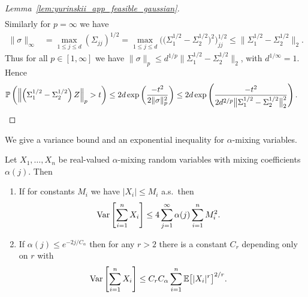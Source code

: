 \begin{proof}[Lemma~\ref{lem:yurinskii_app_feasible_gaussian}]
\begin{align*}
  \end{align*}
  Similarly for $p = \infty$ we have
  \begin{align*}
    \|\sigma\|_\infty
    &=
    \max_{1 \leq j \leq d}
    (\Sigma_{j j})^{1/2}
    =
    \max_{1 \leq j \leq d}
    \Big(\big(\Sigma_1^{1/2} - \Sigma_2^{1/2}\big)^2\Big)_{j j}^{1/2}
    \leq
    \big\|\Sigma_1^{1/2} - \Sigma_2^{1/2}\big\|_2.
  \end{align*}
  Thus for all $p \in [1, \infty]$ we have
  $\|\sigma\|_p \leq
  d^{1/p} \big\|\Sigma_1^{1/2} - \Sigma_2^{1/2}\big\|_2$,
  with $d^{1/\infty} = 1$. Hence
  \begin{align*}
    \P\left(
      \left\|
      \left(\Sigma_1^{1/2} - \Sigma_2^{1/2}\right) Z
      \right\|_p
      > t
    \right)
    &\leq
    2 d \exp \left( \frac{-t^2}{2 \|\sigma\|_p^2} \right)
    \leq
    2 d \exp \left(
      \frac{-t^2}
      {2 d^{2/p} \big\|\Sigma_1^{1/2} - \Sigma_2^{1/2}\big\|_2^2}
    \right).
  \end{align*}
\end{proof}

We give a variance bound and an exponential inequality for $\alpha$-mixing
variables.

\begin{lemma}
  \label{lem:yurinskii_app_variance_mixing}

  Let $X_1, \ldots, X_n$ be
  real-valued $\alpha$-mixing random
  variables with mixing coefficients $\alpha(j)$.
  Then
  \begin{enumerate}[label=(\roman*)]

    \item
      \label{it:yurinskii_app_variance_mixing_bounded}
      If for constants $M_i$ we have
      $|X_i| \leq M_i$ a.s.\ then
      \begin{align*}
        \Var\left[
          \sum_{i=1}^n X_i
        \right]
        &\leq
        4 \sum_{j=1}^\infty \alpha(j)
        \sum_{i=1}^n M_i^2.
      \end{align*}

    \item
      \label{it:yurinskii_app_variance_mixing_exponential}
      If $\alpha(j) \leq e^{-2j / C_\alpha}$ then
      for any $r>2$ there is a constant
      $C_r$ depending only on $r$ with
      \begin{align*}
        \Var\left[
          \sum_{i=1}^n X_i
        \right]
        &\leq
        C_r C_\alpha
        \sum_{i=1}^n
        \E\big[|X_i|^r\big]^{2/r}.
      \end{align*}
  \end{enumerate}
\end{lemma}

